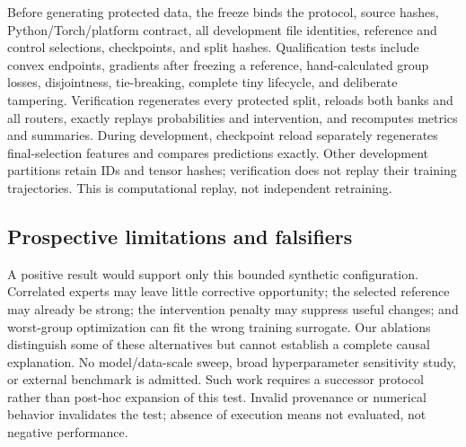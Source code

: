 Before generating protected data, the freeze binds the protocol, source hashes,
Python/Torch/platform contract, all development file identities, reference and
control selections, checkpoints, and split hashes. Qualification tests include
convex endpoints, gradients after freezing a reference, hand-calculated group
losses, disjointness, tie-breaking, complete tiny lifecycle, and deliberate
tampering. Verification regenerates every protected split, reloads both banks and all
routers, exactly replays probabilities and intervention, and recomputes metrics
and summaries. During development, checkpoint reload separately regenerates
final-selection features and compares predictions exactly. Other development
partitions retain IDs and tensor hashes; verification does not replay their
training trajectories. This is computational replay, not independent retraining.

\subsection{Prospective limitations and falsifiers}
A positive result would support only this bounded synthetic configuration.
Correlated experts may leave little corrective opportunity; the selected
reference may already be strong; the intervention penalty may suppress useful
changes; and worst-group optimization can fit the wrong training surrogate.
Our ablations distinguish some of these alternatives but cannot establish a
complete causal explanation. No model/data-scale sweep, broad hyperparameter
sensitivity study, or external benchmark is admitted. Such work requires a
successor protocol rather than post-hoc expansion of this test. Invalid
provenance or numerical behavior invalidates the test; absence of execution
means not evaluated, not negative performance.
